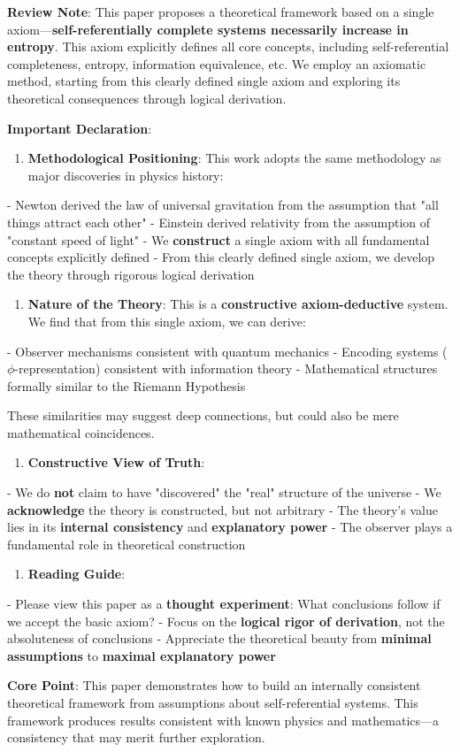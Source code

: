 
\textbf{Review Note}: This paper proposes a theoretical framework based on a single axiom---\textbf{self-referentially complete systems necessarily increase in entropy}. This axiom explicitly defines all core concepts, including self-referential completeness, entropy, information equivalence, etc. We employ an axiomatic method, starting from this clearly defined single axiom and exploring its theoretical consequences through logical derivation.

\textbf{Important Declaration}:

\begin{enumerate}
\item \textbf{Methodological Positioning}: This work adopts the same methodology as major discoveries in physics history:
\end{enumerate}
   - Newton derived the law of universal gravitation from the assumption that "all things attract each other"
   - Einstein derived relativity from the assumption of "constant speed of light"
   - We \textbf{construct} a single axiom with all fundamental concepts explicitly defined
   - From this clearly defined single axiom, we develop the theory through rigorous logical derivation

\begin{enumerate}
\item \textbf{Nature of the Theory}: This is a \textbf{constructive axiom-deductive} system. We find that from this single axiom, we can derive:
\end{enumerate}
   - Observer mechanisms consistent with quantum mechanics
   - Encoding systems ($\phi$-representation) consistent with information theory
   - Mathematical structures formally similar to the Riemann Hypothesis
   
   These similarities may suggest deep connections, but could also be mere mathematical coincidences.

\begin{enumerate}
\item \textbf{Constructive View of Truth}:
\end{enumerate}
   - We do \textbf{not} claim to have "discovered" the "real" structure of the universe
   - We \textbf{acknowledge} the theory is constructed, but not arbitrary
   - The theory's value lies in its \textbf{internal consistency} and \textbf{explanatory power}
   - The observer plays a fundamental role in theoretical construction

\begin{enumerate}
\item \textbf{Reading Guide}:
\end{enumerate}
   - Please view this paper as a \textbf{thought experiment}: What conclusions follow if we accept the basic axiom?
   - Focus on the \textbf{logical rigor of derivation}, not the absoluteness of conclusions
   - Appreciate the theoretical beauty from \textbf{minimal assumptions} to \textbf{maximal explanatory power}

\textbf{Core Point}: This paper demonstrates how to build an internally consistent theoretical framework from assumptions about self-referential systems. This framework produces results consistent with known physics and mathematics---a consistency that may merit further exploration.

